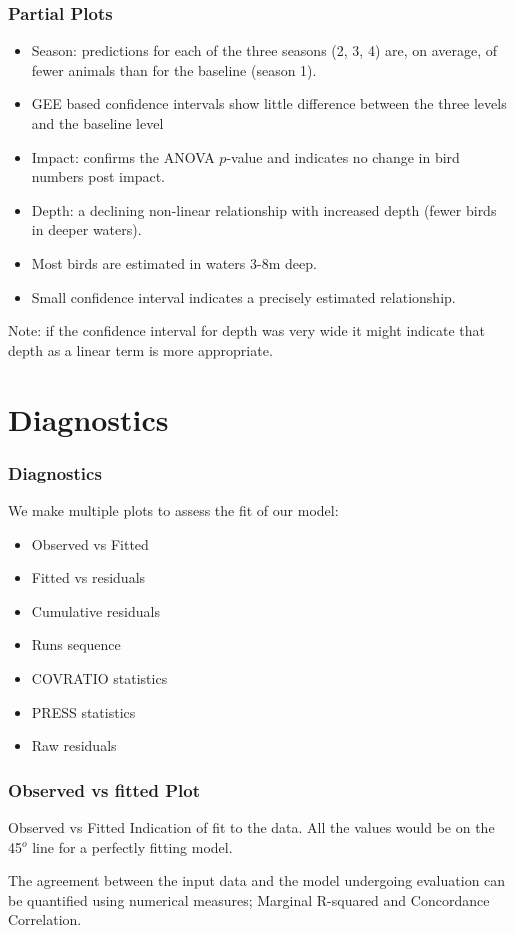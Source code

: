 \begin{frame}
\frametitle{Partial Plots}
\begin{itemize}
\item Season: predictions for each of the three seasons (2, 3, 4) are, on average, of fewer animals than for the baseline (season 1).
\item GEE based confidence intervals show little difference between the three levels and the baseline level \pause
\item Impact: confirms the ANOVA $p$-value and indicates no change in bird numbers post impact.
\pause
\item Depth: a declining non-linear relationship with increased depth (fewer birds in deeper waters).
\item Most birds are estimated in waters 3-8m deep.
\item Small confidence interval indicates a precisely estimated relationship.
\end{itemize}
\pause
\bigskip
Note: if the confidence interval for depth was very wide it might indicate that depth as a linear term is more appropriate.
\end{frame}

\clearpage

\section{Diagnostics}

\begin{frame}[fragile]
\frametitle{Diagnostics}
We make multiple plots to assess the fit of our model:

\bigskip
\begin{itemize}
\item Observed vs Fitted
\item Fitted vs residuals
\item Cumulative residuals
\item Runs sequence
\item COVRATIO statistics
\item PRESS statistics
\item Raw residuals
\end{itemize}
\end{frame}

\begin{frame}[fragile]
\frametitle{Observed vs fitted Plot}

\begin{block}{Observed vs Fitted}
Indication of fit to the data.  All the values would be on the 45$^o$ line for a perfectly fitting model.    
\end{block}

\noindent The agreement between the input data and the model undergoing evaluation can be quantified using numerical measures; Marginal R-squared and Concordance Correlation. 
\end{frame}

